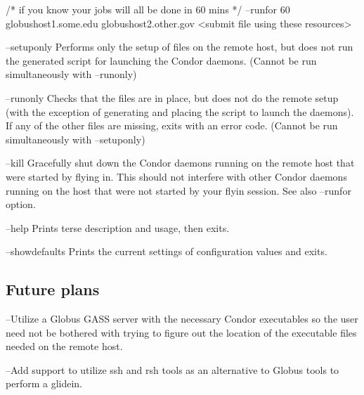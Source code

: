       /* if you know your jobs will all be done in 60 mins */
       --runfor 60 globushost1.some.edu globushost2.other.gov
       <submit file using these resources>

--setuponly
   Performs only the setup of files on the remote host, but does not
   run the generated script for launching the Condor daemons.
   (Cannot be run simultaneously with --runonly)

--runonly
   Checks that the files are in place, but does not do the remote setup
   (with the exception of generating and placing the script to launch
   the daemons). If any of the other files are missing, exits with
   an error code.
   (Cannot be run simultaneously with --setuponly)

--kill
   Gracefully shut down the Condor daemons running on the remote host
   that were started by flying in. This should not interfere with other
   Condor daemons running on the host that were not started by your
   flyin session.
   See also --runfor option.

--help
   Prints terse description and usage, then exits.

--showdefaults
   Prints the current settings of configuration values and exits.

\subsection{Future plans}
--Utilize a Globus GASS server with the necessary Condor executables 
so the user need not be bothered with trying to figure out the location 
of the executable files needed on the remote host.

--Add support to utilize ssh and rsh tools as an alternative to Globus
tools to perform a glidein.

